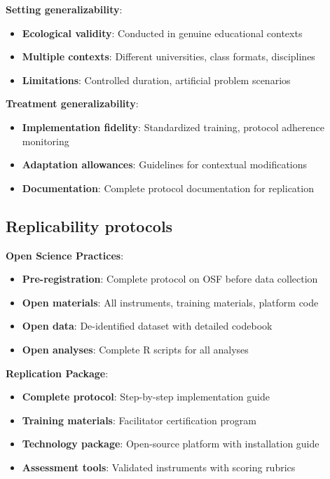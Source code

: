\textbf{Setting generalizability}:
\begin{itemize}
	\item \textbf{Ecological validity}: Conducted in genuine educational contexts
	\item \textbf{Multiple contexts}: Different universities, class formats, disciplines
	\item \textbf{Limitations}: Controlled duration, artificial problem scenarios
\end{itemize}

\textbf{Treatment generalizability}:
\begin{itemize}
	\item \textbf{Implementation fidelity}: Standardized training, protocol adherence monitoring
	\item \textbf{Adaptation allowances}: Guidelines for contextual modifications
	\item \textbf{Documentation}: Complete protocol documentation for replication
\end{itemize}

\subsection{Replicability protocols}

\textbf{Open Science Practices}:
\begin{itemize}
	\item \textbf{Pre-registration}: Complete protocol on OSF before data collection
	\item \textbf{Open materials}: All instruments, training materials, platform code
	\item \textbf{Open data}: De-identified dataset with detailed codebook
	\item \textbf{Open analyses}: Complete R scripts for all analyses
\end{itemize}

\textbf{Replication Package}:
\begin{itemize}
	\item \textbf{Complete protocol}: Step-by-step implementation guide
	\item \textbf{Training materials}: Facilitator certification program
	\item \textbf{Technology package}: Open-source platform with installation guide
	\item \textbf{Assessment tools}: Validated instruments with scoring rubrics
\end{itemize}

